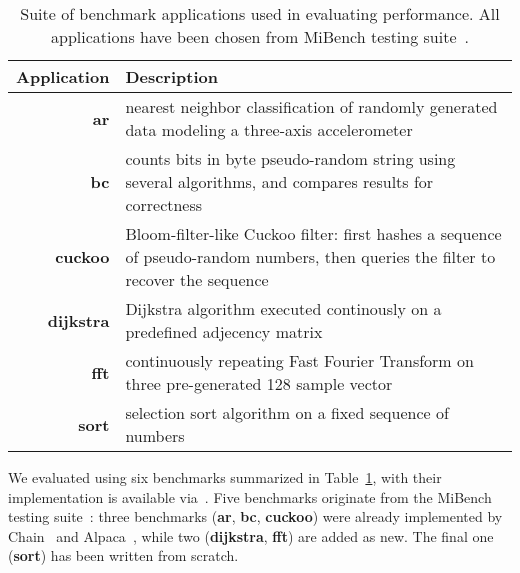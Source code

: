 \begin{table}
	\centering
	\footnotesize
	\begin{tabular}{| r | p{} |}
		\hline
		Application & Description \\
		\hline\hline
		\textbf{ar} & nearest neighbor classification of randomly generated data modeling a three-axis accelerometer\\
		\hline
		\textbf{bc} & counts bits in byte pseudo-random string using several algorithms, and compares results for correctness\\
		\hline
		\textbf{cuckoo} & Bloom-filter-like Cuckoo filter: first hashes a sequence of pseudo-random numbers, then queries the filter to recover the sequence\\
		\hline
		\textbf{dijkstra} &  Dijkstra algorithm executed continously on a predefined adjecency matrix\\
		\hline
		\textbf{fft} & continuously repeating Fast Fourier Transform on three pre-generated 128 sample vector\\
		\hline
		\textbf{sort} & selection sort algorithm on a fixed sequence of numbers\\
		\hline
	\end{tabular}
\caption{Suite of benchmark applications used in evaluating \sys performance. All applications have been chosen from MiBench testing suite~\cite{mibench,hicks_mibench2_2016}.}
\label{table:benchmark_table}
\end{table}

We evaluated \sys using six benchmarks summarized in Table~\ref{table:benchmark_table}, with their implementation is available via~\cite{coala_website}. Five benchmarks originate from the MiBench testing suite~\cite{mibench,hicks_mibench2_2016}: three benchmarks (\textbf{ar}, \textbf{bc}, \textbf{cuckoo}) were already implemented by Chain~\cite{chain} and Alpaca~\cite{alpaca}, while two (\textbf{dijkstra}, \textbf{fft}) are added as new. The final one (\textbf{sort}) has been written from scratch. 


